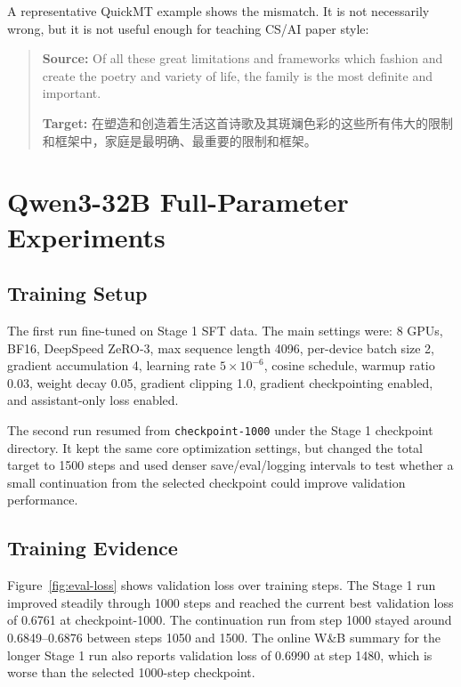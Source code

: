 \documentclass{article}
\begin{document}
A representative QuickMT example shows the mismatch. It is not necessarily wrong, but it is not useful enough for teaching CS/AI paper style:

\begin{quote}\small
    \textbf{Source:} Of all these great limitations and frameworks which fashion and create the poetry and variety of life, the family is the most definite and important.

    \textbf{Target:} 在塑造和创造着生活这首诗歌及其斑斓色彩的这些所有伟大的限制和框架中，家庭是最明确、最重要的限制和框架。
\end{quote}

\section{Qwen3-32B Full-Parameter Experiments}

\subsection{Training Setup}

The first run fine-tuned  on Stage 1 SFT data. The main settings were: 8 GPUs, BF16, DeepSpeed ZeRO-3, max sequence length 4096, per-device batch size 2, gradient accumulation 4, learning rate \(5\times10^{-6}\), cosine schedule, warmup ratio 0.03, weight decay 0.05, gradient clipping 1.0, gradient checkpointing enabled, and assistant-only loss enabled.

The second run resumed from \texttt{checkpoint-1000} under the Stage 1 checkpoint directory. It kept the same core optimization settings, but changed the total target to 1500 steps and used denser save/eval/logging intervals to test whether a small continuation from the selected checkpoint could improve validation performance.

\begin{table}[htbp]
    \centering
    \caption{Completed and partially completed Qwen3-32B training runs.}
    \label{tab:training-summary}
    \resizebox{\textwidth}{!}{}
\end{table}

\subsection{Training Evidence}

Figure~\ref{fig:eval-loss} shows validation loss over training steps. The Stage 1 run improved steadily through 1000 steps and reached the current best validation loss of 0.6761 at checkpoint-1000. The continuation run from step 1000 stayed around 0.6849--0.6876 between steps 1050 and 1500. The online W\&B summary for the longer Stage 1 run also reports validation loss of 0.6990 at step 1480, which is worse than the selected 1000-step checkpoint.
\end{document}
